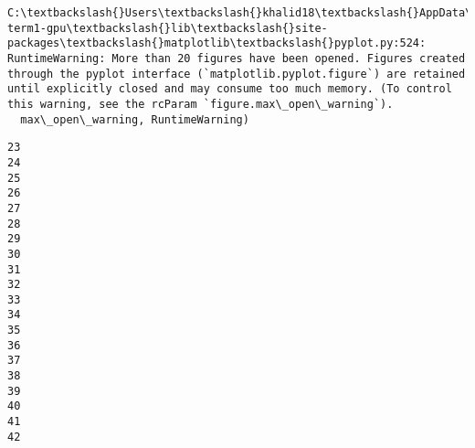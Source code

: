 \documentclass[11pt]{article}
\begin{document}
    \begin{Verbatim}[commandchars=\\\{\}]
C:\textbackslash{}Users\textbackslash{}khalid18\textbackslash{}AppData\textbackslash{}Local\textbackslash{}conda\textbackslash{}conda\textbackslash{}envs\textbackslash{}carnd-term1-gpu\textbackslash{}lib\textbackslash{}site-packages\textbackslash{}matplotlib\textbackslash{}pyplot.py:524: RuntimeWarning: More than 20 figures have been opened. Figures created through the pyplot interface (`matplotlib.pyplot.figure`) are retained until explicitly closed and may consume too much memory. (To control this warning, see the rcParam `figure.max\_open\_warning`).
  max\_open\_warning, RuntimeWarning)

    \end{Verbatim}

    \begin{Verbatim}[commandchars=\\\{\}]
23
24
25
26
27
28
29
30
31
32
33
34
35
36
37
38
39
40
41
42

    \end{Verbatim}

    \begin{center}
    \end{center}
    { \hspace*{\fill} \\}
    
    \begin{center}
    \end{center}
    { \hspace*{\fill} \\}
    
    \begin{center}
    \end{center}
    { \hspace*{\fill} \\}
    
    \begin{center}
    \end{center}
    { \hspace*{\fill} \\}
    
    \begin{center}
    \end{center}
    { \hspace*{\fill} \\}
    
\end{document}
